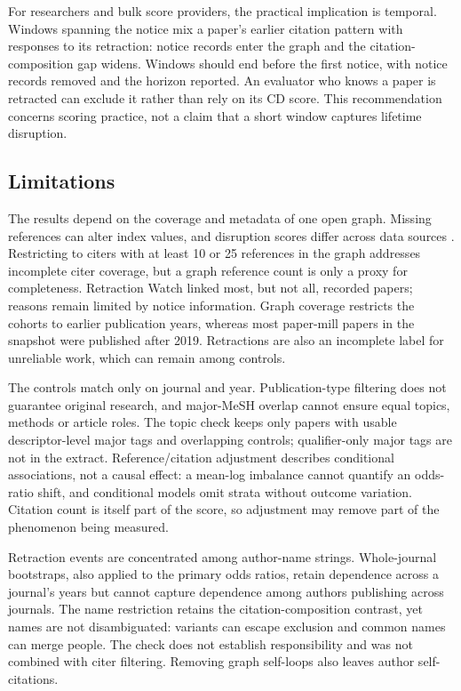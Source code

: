 For researchers and bulk score providers, the practical implication is temporal. Windows spanning the notice
mix a paper's earlier citation pattern with responses to its retraction: notice records enter the graph and
the citation-composition gap widens. Windows should end before the first notice, with notice records removed
and the horizon reported. An evaluator who knows a paper is retracted can exclude it rather than rely on its CD score.
This recommendation concerns scoring practice, not a claim that a short window captures lifetime disruption.

\subsection{Limitations}
The results depend on the coverage and metadata of one open graph. Missing references can alter index values,
and disruption scores differ across data sources \citep{xu2025alternative,crossdi2025}.
Restricting to citers with at least 10 or 25 references in the graph addresses incomplete citer coverage,
but a graph reference count is only a proxy for completeness.
Retraction Watch linked most, but not all, recorded papers; reasons remain limited by notice information.
Graph coverage restricts the cohorts to earlier publication years, whereas most paper-mill papers in the snapshot
were published after 2019. Retractions are also an incomplete label for unreliable work, which can remain among controls.

The controls match only on journal and year. Publication-type filtering does not guarantee original research,
and major-MeSH overlap cannot ensure equal topics, methods or article roles. The topic check keeps only papers
with usable descriptor-level major tags and overlapping controls; qualifier-only major tags are not in the extract.
Reference/citation adjustment describes conditional
associations, not a causal effect: a mean-log imbalance cannot quantify an odds-ratio shift, and conditional
models omit strata without outcome variation. Citation count is itself part of the score, so adjustment may remove
part of the phenomenon being measured.

Retraction events are concentrated among author-name strings. Whole-journal bootstraps, also applied to the
primary odds ratios, retain dependence across a journal's years but cannot capture dependence among authors
publishing across journals. The name restriction
retains the citation-composition contrast, yet names are not disambiguated: variants can escape exclusion and
common names can merge people. The check does not establish responsibility and was not combined with citer filtering.
Removing graph self-loops also leaves author self-citations.

